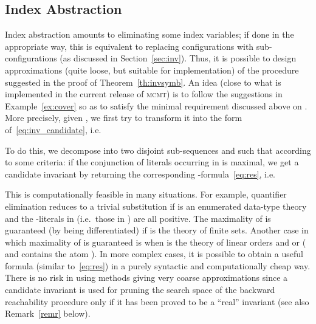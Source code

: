 \documentclass{LMCS}
\theoremstyle{plain}\newtheorem{assumption}[thm]{Assumption}
\theoremstyle{plain}\newtheorem{proposition}[thm]{Proposition}
\theoremstyle{plain}\newtheorem{property}[thm]{Property}
\theoremstyle{plain}\newtheorem{example}[thm]{Example}
\theoremstyle{plain}\newtheorem{claim}[thm]{Claim}
\theoremstyle{plain}\newtheorem{lemma}[thm]{Lemma}
\begin{document}
\subsection{Index  Abstraction}
\label{sec:back+inv-heu}
Index abstraction amounts to eliminating some index variables; if done
in the appropriate way, this is equivalent to replacing configurations
with sub-con\-fi\-gu\-ra\-tions (as discussed in
Section~\ref{sec:inv}).  Thus, it is possible to design approximations
(quite loose, but suitable for implementation) of the procedure
suggested in the proof of Theorem~\ref{th:invsymb}.  An idea (close to
what is implemented in the current release of \textsc{mcmt}) is to
follow the suggestions in Example~\ref{ex:cover} so as to satisfy the
minimal requirement discussed above on .
More precisely, given , we first
try to transform it into the form of~\eqref{eq:inv_candidate}, i.e.

To do this, we decompose  into two disjoint sub-sequences 
and  such that  according to some criteria: if
the conjunction of  literals occurring in  is
maximal, we get a candidate invariant by returning the corresponding
-formula~\eqref{eq:res}, i.e.

This is computationally feasible in many situations.  For example,
quantifier elimination reduces to a trivial substitution if  is
an enumerated data-type theory and the -literals in 
(i.e.\ those in ) are all positive.  The maximality of
 is guaranteed (by being differentiated) if  is the
theory of finite sets.  Another case in which maximality of 
is guaranteed is when
 is the theory of linear orders and  or
( and  contains the atom ). In more
complex cases, it is possible to obtain
a useful formula (similar to~\eqref{eq:res}) in a purely syntactic and
computationally cheap way.  There is no risk in using methods giving
very coarse approximations since
a candidate invariant is used for pruning the search space of the
backward reachability procedure only if it has been proved to be a
``real'' invariant (see also Remark~\ref{remr} below).
\end{document}
